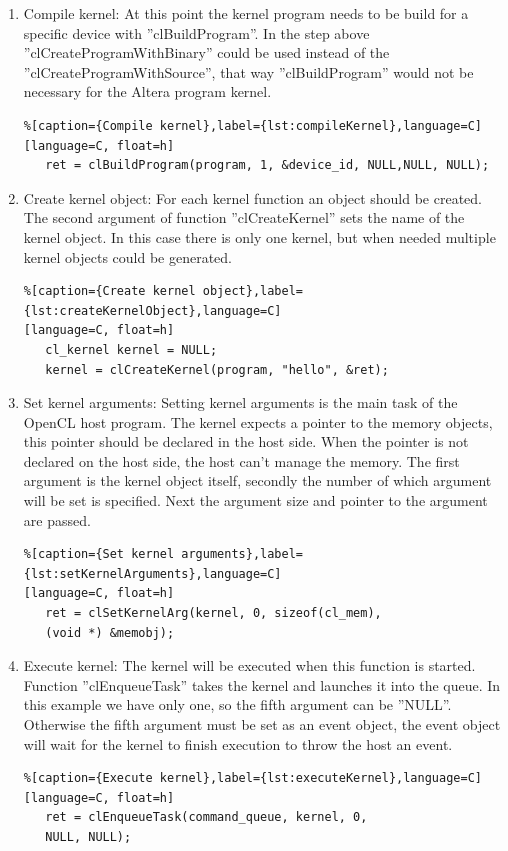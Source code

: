 \documentclass[12pt,a4paper,english,twoside,openright]{tutthesis}
\begin{document}
\begin{enumerate}
	\item Compile kernel:	At this point the kernel program needs to be build for a specific device with ''clBuildProgram''. In the step above ''clCreateProgramWithBinary'' could be used instead of the ''clCreateProgramWithSource'', that way ''clBuildProgram'' would not be necessary for the Altera program kernel.
\begin{lstlisting}%[caption={Compile kernel},label={lst:compileKernel},language=C]
[language=C, float=h]
   ret = clBuildProgram(program, 1, &device_id, NULL,NULL, NULL);
\end{lstlisting}
	
	\item Create kernel object:	For each kernel function an object should be created. The second argument of function ''clCreateKernel'' sets the name of the kernel object. In this case there is only one kernel, but when needed multiple kernel objects could be generated.
\begin{lstlisting}%[caption={Create kernel object},label={lst:createKernelObject},language=C]
[language=C, float=h]
   cl_kernel kernel = NULL;
   kernel = clCreateKernel(program, "hello", &ret);
\end{lstlisting}

	\item Set kernel arguments:	Setting kernel arguments is the main task of the OpenCL host program. The kernel expects a pointer to the memory objects, this pointer should be declared in the host side. When the pointer is not declared on the host side, the host can't manage the memory. The first argument is the kernel object itself, secondly the number of which argument will be set is specified. Next the argument size and pointer to the argument are passed.
\begin{lstlisting}%[caption={Set kernel arguments},label={lst:setKernelArguments},language=C]
[language=C, float=h]
   ret = clSetKernelArg(kernel, 0, sizeof(cl_mem),
   (void *) &memobj);
\end{lstlisting}

	\item Execute kernel:	The kernel will be executed when this function is started. Function ''clEnqueueTask'' takes the kernel and launches it into the queue. In this example we have only one, so the fifth argument can be ''NULL''. Otherwise the fifth argument must be set as an event object, the event object will wait for the kernel to finish execution to throw the host an event.
\begin{lstlisting}%[caption={Execute kernel},label={lst:executeKernel},language=C]
[language=C, float=h]
   ret = clEnqueueTask(command_queue, kernel, 0,
   NULL, NULL);
\end{lstlisting}


\end{enumerate}
\end{document}
